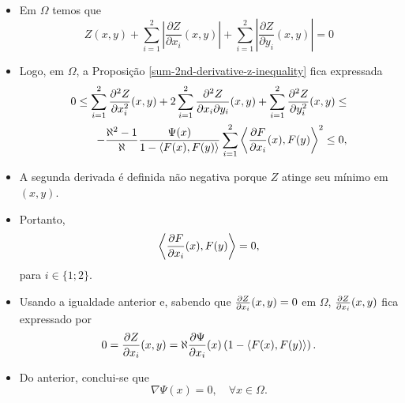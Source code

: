 \documentclass[12pt,a4paper]{beamer}
\theoremstyle{definition}
\begin{document}
\begin{frame}

	\begin{itemize}
		\item Em $\Omega$ temos que
		\begin{equation*}
		Z(x,y) + \sum_{i=1}^{2} \left| \frac{\partial Z}{\partial x_i}(x,y) \right| + \sum_{i=1}^{2} \left| \frac{\partial Z}{\partial y_i}(x,y) \right| = 0
		\end{equation*}
		
		\pause
		
		\item Logo, em $\Omega$, a Proposição \ref{sum-2nd-derivative-z-inequality} fica expressada
		\begin{align*}
		0 \leq \sum_{i=1}^{2} \frac{\partial^2 Z}{\partial x_i^2}(x,y) + 2 \sum_{i=1}^{2} \frac{\partial^2 Z}{\partial x_i \partial y_i}(x,y) + \sum_{i=1}^{2} \frac{\partial^2 Z}{\partial y_i^2}(x,y) \leq \\
		- \frac{\aleph^2 -1}{\aleph} \frac{\Psi(x)}{1 - \left\langle F(x),F(y) \right\rangle} \sum_{i=1}^{2} \left\langle \frac{\partial F}{\partial x_i}(x),F(y) \right\rangle^2 \leq 0,
		\end{align*}
		
		\pause
		
		\item A segunda derivada é definida não negativa porque $Z$ atinge seu mínimo em $(x,y)$.
	\end{itemize}

\end{frame}

\begin{frame}

	\begin{itemize}
		\item Portanto, 
		\begin{equation*}
		\left\langle \frac{\partial F}{\partial x_i}(x),F(y) \right\rangle = 0,
		\end{equation*}
		para $i \in \{1;2\}$.
		
		\pause
		
		\item Usando a igualdade anterior e, sabendo que $\frac{\partial Z}{\partial x_i}(x,y)=0$ em $\Omega$, $\frac{\partial Z}{\partial x_i}(x,y)$ fica expressado por
		\begin{equation*}
		0 = \frac{\partial Z}{\partial x_i}(x,y) = \aleph \frac{\partial \Psi}{\partial x_i}(x) \left( 1 - \left\langle F(x),F(y) \right\rangle \right).
		\end{equation*}
		
		\pause
		
		\item Do anterior, conclui-se que
		\begin{equation*}
		\nabla \Psi(x) = 0, \quad \forall x \in \Omega.
		\end{equation*}
	\end{itemize}

\end{frame}	
	
\end{document}
